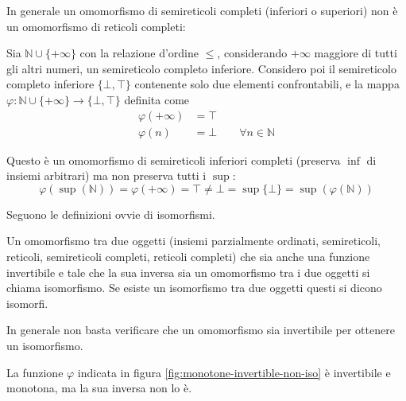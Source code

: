 \documentclass[12pt]{article}
\numberwithin{theorem}{subsection}
\newcommand{\setN}{\mathbb{N}}
\begin{document}
In generale un omomorfismo di semireticoli completi (inferiori o superiori) non è un omomorfismo di reticoli completi:
\begin{example}\label{ex:complete-sempilattice-morph-not-complete-lattice}
	Sia $\setN \cup \{ +\infty \}$ con la relazione d'ordine $\le$, considerando $+ \infty$ maggiore di tutti gli altri numeri, un semireticolo completo inferiore. Considero poi il semireticolo completo inferiore $\{ \bot, \top \}$ contenente solo due elementi confrontabili, e la mappa $\varphi: \setN \cup \{ + \infty \} \rightarrow \{ \bot, \top \}$ definita come
	\begin{align*}
		\varphi(+ \infty) &= \top \\
		\varphi(n) &= \bot \qquad \forall n \in \setN
	\end{align*}
	
	Questo è un omomorfismo di semireticoli inferiori completi (preserva $\inf$ di insiemi arbitrari) ma non preserva tutti i $\sup$:
	\[
	\varphi(\sup(\setN)) = \varphi(+ \infty) = \top \neq \bot = \sup\{ \bot \} = \sup(\varphi(\setN))
	\]
\end{example}

Seguono le definizioni ovvie di isomorfismi.
\begin{definition}[Isomorfismi]
	Un omomorfismo tra due oggetti (insiemi parzialmente ordinati, semireticoli, reticoli, semireticoli completi, reticoli completi) che sia anche una funzione invertibile e tale che la sua inversa sia un omomorfismo tra i due oggetti si chiama isomorfismo. Se esiste un isomorfismo tra due oggetti questi si dicono isomorfi.
\end{definition} 

In generale non basta verificare che un omomorfismo sia invertibile per ottenere un isomorfismo.
\begin{example}
	\begin{figure*}
		\centering
		\caption{Funzione monotona invertibile che non è un isomorfismo}
		\label{fig:monotone-invertible-non-iso}
	\end{figure*}
	
	La funzione $\varphi$ indicata in figura \ref{fig:monotone-invertible-non-iso} è invertibile e monotona, ma la sua inversa non lo è.
\end{example}
\end{document}
